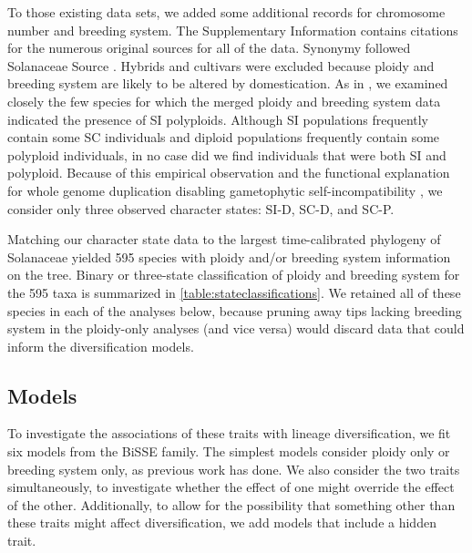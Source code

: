 To those existing data sets, we added some additional records for chromosome number and breeding system.
The Supplementary Information contains citations for the numerous original sources for all of the data. %
Synonymy followed Solanaceae Source \citep{solsource}.
Hybrids and cultivars were excluded because ploidy and breeding system are likely to be altered by domestication.
As in \citet{robertson_2011}, we examined closely the few species for which the merged ploidy and breeding system data indicated the presence of SI polyploids.
Although SI populations frequently contain some SC individuals and diploid populations frequently contain some polyploid individuals, in no case did we find individuals that were both SI and polyploid.
Because of this empirical observation and the functional explanation for whole genome duplication disabling gametophytic self-incompatibility \citep[reviewed in][]{ramsey_1998,stone_2002}, we consider only three observed character states: SI-D, SC-D, and SC-P.


Matching our character state data to the largest time-calibrated phylogeny of Solanaceae \citep{sarkinen_2013} yielded 595 species with ploidy and/or breeding system information on the tree.
Binary or three-state classification of ploidy and breeding system for the 595 taxa is summarized in \cref{table:stateclassifications}. %
We retained all of these species in each of the analyses below, because pruning away tips lacking breeding system in the ploidy-only analyses (and vice versa) would discard data that could inform the diversification models.

\subsection{Models}

To investigate the associations of these traits with lineage diversification, we fit six models from the BiSSE \citep{maddison_2007} family.
The simplest models consider ploidy only or breeding system only, as previous work has done. %
We also consider the two traits simultaneously, to investigate whether the effect of one might override the effect of the other.
Additionally, to allow for the possibility that something other than these traits might affect diversification, we add models that include a hidden trait. %

